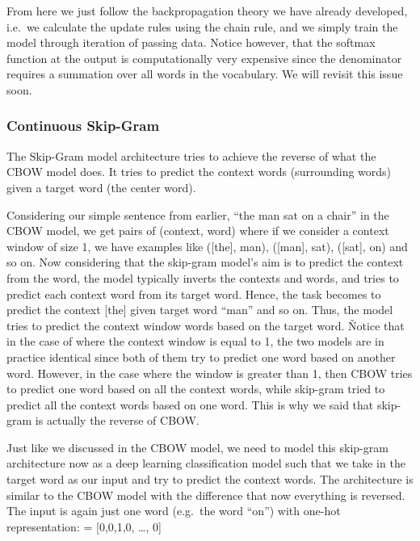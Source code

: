 From here we just follow the backpropagation theory we have already developed, i.e.\ we calculate the update rules
using the chain rule, and we simply train the model through iteration of passing data. Notice however, that the
softmax function at the output is computationally very expensive since the denominator requires a summation over all
words in the vocabulary. We will revisit this issue soon.

\subsubsection{Continuous Skip-Gram}

The Skip-Gram model architecture tries to achieve the reverse of what the CBOW model does. It tries to predict the
context words (surrounding words) given a target word (the center word).

\be
Considering our simple sentence from earlier, ``the man sat on a chair'' in the CBOW model, we get pairs of (context,
word) where if we consider a context window of size 1, we have examples like ([the], man), ([man], sat), ([sat], on)
and so on. Now considering that the skip-gram model's aim is to predict the context from the word, the model
typically inverts the contexts and words, and tries to predict each context word from its target word. Hence, the
task becomes to predict the context [the] given target word ``man'' and so on. Thus, the model tries to predict the
context window words based on the target word. \v

Notice that in the case of where the context window is equal to 1, the two models are in practice identical since
both of them try to predict one word based on another word. However, in the case where the window is greater than 1,
then CBOW tries to predict one word based on all the context words, while skip-gram tried to predict all the context
words based on one word. This is why we said that skip-gram is actually the reverse of CBOW.

\ee

Just like we discussed in the CBOW model, we need to model this skip-gram architecture now as a deep learning
classification model such that we take in the target word as our input and try to predict the context words. The
architecture is similar to the CBOW model with the difference that now everything is reversed. The input is again
just one word (e.g.\ the word ``on'') with one-hot representation:
\bse
{} = [0,0,1,0, \ldots, 0]
\ese


